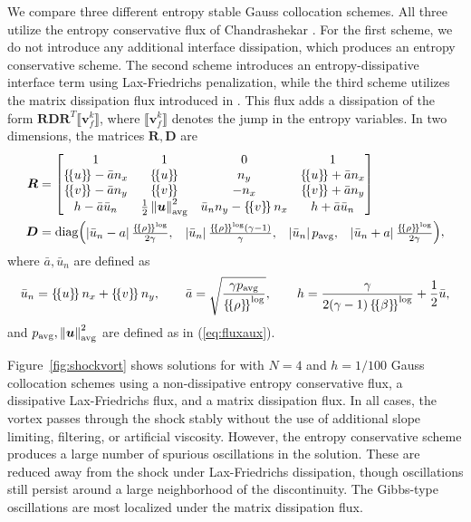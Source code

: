 \documentclass[review,onefignum,onetabnum,final]{siamart171218}
\newcommand{\nor}[1]{\left\| #1 \right\|}
\newcommand{\LRb}[1]{\left| #1 \right|}
\newcommand{\LRc}[1]{\left\{ #1 \right\}}
\newcommand{\jump}[1] {\ensuremath{\llbracket#1\rrbracket}}
\newcommand{\avg}[1] {\ensuremath{\LRc{\!\{#1\}\!}}}
\begin{document}
We compare three different entropy stable Gauss collocation schemes.  All three utilize the entropy conservative flux of Chandrashekar \cite{chandrashekar2013kinetic}.  For the first scheme, we do not introduce any additional interface dissipation, which produces an entropy conservative scheme.  The second scheme introduces an entropy-dissipative interface term using Lax-Friedrichs penalization, while the third scheme utilizes the matrix dissipation flux introduced in \cite{winters2017uniquely}.  This flux adds a dissipation of the form $\bm{R}\bm{D}\bm{R}^T\jump{{\bm{v}}^k_f}$, where $\jump{{\bm{v}}^k_f}$ denotes the jump in the entropy variables.  In two dimensions, the matrices $\bm{R}, \bm{D}$ are 
\begin{align*}
\bm{R} &= \begin{bmatrix}
1 & 1 & 0 & 1\\
\avg{u}-\bar{a} n_x & \avg{u} & n_y & \avg{u}+\bar{a} n_x\\
\avg{v}-\bar{a} n_y & \avg{v} & -n_x & \avg{v}+\bar{a} n_y\\
h-\bar{a} \bar{u}_n & \frac{1}{2}\nor{\bm{u}}^2_{\rm avg} & \bar{u}_n n_y - \avg{v}n_x & h + \bar{a} \bar{u}_n
\end{bmatrix}\\
\bm{D} &= {\rm diag}{\begin{pmatrix}
\LRb{\bar{u}_n - a}\frac{\avg{\rho}^{\log}}{2\gamma}, & \LRb{\bar{u}_n}\frac{\avg{\rho}^{\log}(\gamma-1)}{\gamma}, & \LRb{\bar{u}_n}p_{\rm avg}, & \LRb{\bar{u}_n + a}\frac{\avg{\rho}^{\log}}{2\gamma} \end{pmatrix}},
\end{align*}
where $\bar{a}, \bar{u}_n$ are defined as
\begin{gather*}
\bar{u}_n = \avg{u}n_x + \avg{v}n_y, \qquad \bar{a} = \sqrt{\frac{\gamma p_{\rm avg}}{\avg{\rho}^{\log}}}, \qquad h = \frac{\gamma}{2(\gamma-1)\avg{\beta}^{\log}} + \frac{1}{2}\bar{u}, 
\end{gather*}
and $p_{\rm avg}, \nor{\bm{u}}^2_{\rm avg}$ are defined as in (\ref{eq:fluxaux}).  

Figure~\ref{fig:shockvort} shows solutions for with $N=4$ and $h = 1/100$ Gauss collocation schemes using a non-dissipative entropy conservative flux, a dissipative Lax-Friedrichs flux, and a matrix dissipation flux.  In all cases, the vortex passes through the shock stably without the use of additional slope limiting, filtering, or artificial viscosity.  However, the entropy conservative scheme produces a large number of spurious oscillations in the solution.  These are reduced away from the shock under Lax-Friedrichs dissipation, though oscillations still persist around a large neighborhood of the discontinuity.  The Gibbs-type oscillations are most localized under the matrix dissipation flux.  
\end{document}

